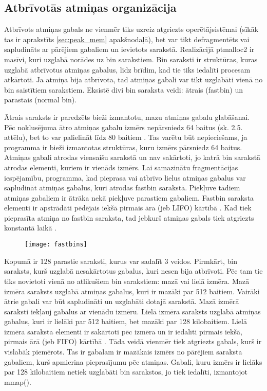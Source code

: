  \subsection{Atbrīvotās atmiņas organizācija}
 \label{subsec:bin_saraksti}
Atbrīvots atmiņas gabals ne vienmēr tiks uzreiz atgriezts operētājsistēmai (sīkāk tas ir aprakstīts \ref{sec:peak_mem} apakšnodaļā), bet var tikt defragmentēts vai sapludināts ar pārējiem gabaliem un ievietots sarakstā. 
Realizācijā ptmalloc2 ir masīvi, kuri uzglabā norādes uz bin sarakstiem.
Bin saraksti ir struktūras, kuras uzglabā atbrīvotus atmiņas gabalus, līdz brīdim, kad tie tiks iedalīti procesam atkārtoti.
Ja atmiņa bija atbrīvota, tad atmiņas gabali var tikt uzglabāti vienā no bin saistītiem sarakstiem.
Eksistē divi bin saraksta veidi: ātrais (fastbin) un parastais (normal bin).


Ātrais saraksts ir paredzēts bieži izmantotu, mazu atmiņas gabalu glabāšanai.
Pēc noklusējuma ātro atmiņas gabalu izmērs nepārsniedz 64 baitus (sk. 2.5. attēlu), bet to var palielināt līdz 80 baitiem \cite {MALLOC}. 
Tas varētu būt nepieciešams, ja programma ir bieži izmantotas struktūras, kuru izmērs pārsniedz 64 baitus.
Atmiņas gabali atrodas viensaišu sarakstā un nav sakārtoti, jo katrā bin sarakstā atrodas elementi, kuriem ir vienāds izmērs.
Lai samazinātu fragmentācijas iespējamību, programma, kad pieprasa vai atbrīvo lielus atmiņas gabalus var sapludināt atmiņas gabalus, kuri atrodas fastbin sarakstā.
Piekļuve tādiem atmiņas gabaliem ir ātrāka nekā piekļuve parastiem gabaliem. 
Fastbin saraksta elementi ir apstrādāti pēdējais iekšā pirmais āra (jeb LIFO) kārtībā \cite {Binning}.
Kad tiek pieprasīta atmiņa no fastbin saraksta, tad jebkurš atmiņas gabals tiek atgriezts konstantā laikā  \cite {ACCA}.
\begin{figure}[h]
\begin{center}
\texttt{[image: fastbins]}
\end{center}
\caption{\textbf{\fontsize{11}{12}\selectfont {Ātrais saraksts}}}
\label{fig:fastbin}
\end{figure}

Kopumā ir 128 parastie saraksti, kurus var sadalīt 3 veidos. 
Pirmkārt, bin saraksts, kurš uzglabā nesakārtotus gabalus, kuri nesen bija atbrīvoti.  
Pēc tam tie tiks novietoti vienā no atlikušiem bin sarakstiem: mazā vai lielā izmēra. 
Mazā izmēra saraksts uzglabā atmiņas gabalus, kuri ir mazāki par 512 baitiem. 
Vairāki ātrie gabali var būt sapludināti un uzglabāti dotajā sarakstā. 
Mazā izmērā saraksti iekļauj gabalus ar vienādu izmēru. 
Lielā izmēra saraksts uzglabā atmiņas gabalus, kuri ir lielāki par 512 baitiem, bet mazāki par 128 kilobaitiem. 
Lielā izmēra saraksta elementi ir sakārtoti pēc izmēra un ir iedalīti pirmais iekšā, pirmais ārā (jeb FIFO) kārtībā \cite {Binning}. 
Tāda veidā vienmēr tiek atgriezts gabals, kurš ir vislabāk piemērots.
Tas ir gabalam ir mazākais izmērs no pārējiem saraksta gabaliem, kurš apmierina pieprasījumu pēc atmiņas.
Gabali, kuru izmērs ir lielāks par 128 kilobaitiem netiek uzglabāti bin sarakstos, jo tiek iedalīti, izmantojot mmap(). 




